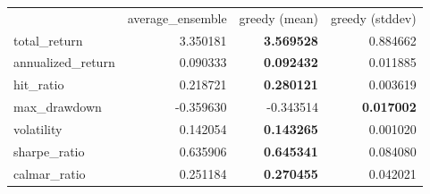 \begin{tabular}{lrrr}
 & average_ensemble & greedy (mean) & greedy (stddev) \\
total_return & 3.350181 & \bfseries 3.569528 & 0.884662 \\
annualized_return & 0.090333 & \bfseries 0.092432 & 0.011885 \\
hit_ratio & 0.218721 & \bfseries 0.280121 & 0.003619 \\
max_drawdown & -0.359630 & -0.343514 & \bfseries 0.017002 \\
volatility & 0.142054 & \bfseries 0.143265 & 0.001020 \\
sharpe_ratio & 0.635906 & \bfseries 0.645341 & 0.084080 \\
calmar_ratio & 0.251184 & \bfseries 0.270455 & 0.042021 \\
\end{tabular}
